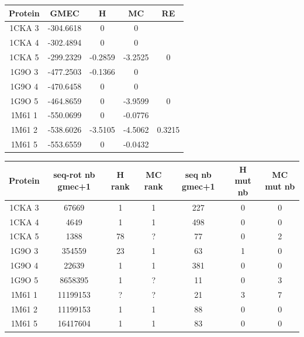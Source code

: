 \documentclass[a4paper,12pt]{article}
\begin{document}
    \begin{table}[h]
      \centering

      \begin{tabular}{|c|c|c|c|c|}


        \hline
        Protein & GMEC & H & MC & RE \\
        \hline
        1CKA 3 & -304.6618 & 0 & 0 & \\
        1CKA 4 & -302.4894 & 0 & 0 & \\
        1CKA 5 & -299.2329 & -0.2859 & -3.2525 & 0 \\
        1G9O 3 & -477.2503 & -0.1366 & 0 & \\
        1G9O 4 & -470.6458 & 0 & 0 & \\
        1G9O 5 & -464.8659 & 0 & -3.9599 &  0 \\
        1M61 1 & -550.0699 & 0 & -0.0776 & \\
        1M61 2 & -538.6026 & -3.5105 & -4.5062 & 0.3215 \\
        1M61 5 & -553.6559 & 0 & -0.0432 & \\
        
        \hline


 \end{tabular}      
 \label{tab_1}      
\end{table}


    \begin{table}[h]
      \centering

      \begin{tabular}{|c|c|c|c|c|c|c|}


        \hline
        Protein & seq-rot nb gmec+1 & H rank  & MC rank  & seq nb gmec+1 & H mut nb & MC mut nb \\
        \hline
        1CKA 3 & 67669 & 1 & 1 & 227 & 0 & 0 \\
        1CKA 4 & 4649 & 1 & 1 & 498 & 0 & 0 \\
        1CKA 5 & 1388 & 78 & ? & 77 & 0 & 2 \\
        1G9O 3 & 354559 & 23 & 1 & 63 & 1 & 0 \\
        1G9O 4 & 22639 & 1 & 1 & 381 & 0 & 0 \\
        1G9O 5 & 8658395 & 1 & ? &  11 & 0 & 3 \\
        1M61 1 & 11199153 & ? & ? & 21 & 3 & 7 \\
        1M61 2 & 11199153 & 1 & 1 & 88 & 0 & 0 \\
        1M61 5 & 16417604 & 1 & 1 & 83 & 0 & 0 \\
        
        \hline


 \end{tabular}      
 \label{tab_2}      
\end{table}
\end{document}
